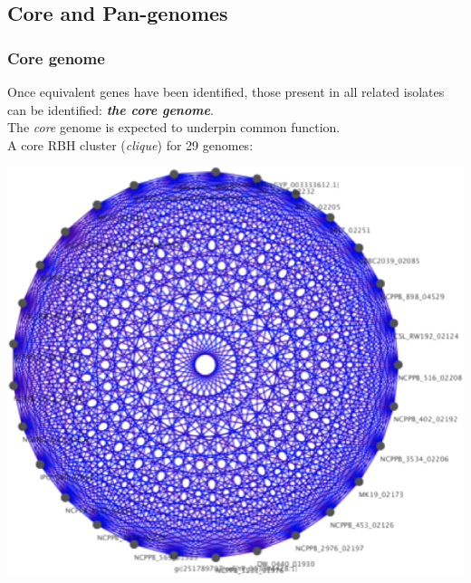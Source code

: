 \subsection{Core and Pan-genomes}

\begin{frame}
  \frametitle{Core genome}
  Once equivalent genes have been identified, those present in all related isolates can be identified: \textbf{\textit{the core genome}}.\\
  The \textit{core} genome is expected to underpin common function.\\
  A core RBH cluster (\textit{clique}) for 29 genomes:
  \begin{center}
      \includegraphics[height=0.55\textheight]{images/core_cluster} 
  \end{center}
\end{frame}

